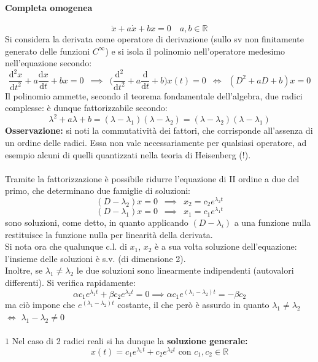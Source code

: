 \documentclass[10pt]{article}
\theoremstyle{plain}
\begin{document}
\paragraph*{Completa omogenea}
\[\ddot x + a \dot x + b x = 0 \quad a,b \in \mathbb{R}\]
Si considera la derivata come operatore di derivazione (sullo sv non finitamente generato delle funzioni $C^{\infty}$) e si isola il polinomio nell'operatore medesimo nell'equazione secondo:
\[\frac{\textrm{d}^2x}{\textrm{d}t^2} + a \frac{\textrm{d}x}{\textrm{d}t} + b x = 0 \enspace \implies \enspace \big(\frac{\textrm{d}^2}{\textrm{d}t^2} + a \frac{\textrm{d}}{\textrm{d}t} + b\big) x(t) = 0 \enspace \Leftrightarrow \enspace (D^2 + aD +b) x = 0\]
Il polinomio ammette, secondo il teorema fondamentale dell'algebra, due radici complesse: è dunque fattorizzabile secondo:
\[\lambda^2 + a\lambda + b = (\lambda - \lambda_1) (\lambda - \lambda_2) = (\lambda - \lambda_2) (\lambda - \lambda_1)\]
\textbf{Osservazione:} si noti la commutatività dei fattori, che corrisponde all'assenza di un ordine delle radici. Essa non vale necessariamente per qualsiasi operatore, ad esempio alcuni di quelli quantizzati nella teoria di Heisenberg (!).
\\~\\Tramite la fattorizzazione è possibile ridurre l'equazione di II ordine a due del primo, che determinano due famiglie di soluzioni:
\[(D - \lambda_2)x = 0 \enspace \implies \enspace x_2 = c_2 e^{\lambda_2 t}\]
\[(D - \lambda_1)x = 0 \enspace \implies \enspace x_1 = c_1 e^{\lambda_1 t}\]
sono soluzioni, come detto, in quanto applicando $(D - \lambda_i)$ a una funzione nulla restituisce la funzione nulla per linearità della derivata.
\\Si nota ora che qualunque c.l. di $x_1$, $x_2$ è a sua volta soluzione dell'equazione: l'insieme delle soluzioni è s.v. (di dimensione 2).
\\Inoltre, se $\lambda_1 \neq \lambda_2$ le due soluzioni sono linearmente indipendenti (autovalori differenti). Si verifica rapidamente:
\[\alpha c_1 e^{\lambda_1 t} + \beta c_2 e^{\lambda_2 t} = 0 \implies \alpha c_1 e^{(\lambda_1-\lambda_2) t} = - \beta c_2\]
ma ciò impone che $e^{(\lambda_1-\lambda_2) t}$ costante, il che però è assurdo in quanto $\lambda_1 \neq \lambda_2$ $\Leftrightarrow$ $\lambda_1 - \lambda_2 \neq 0$
\\~\\$\boxed{1}$ Nel caso di 2 radici reali si ha dunque la \textbf{soluzione generale:}
\[\boxed{x(t) = c_1 e^{\lambda_1 t} + c_2 e^{\lambda_2 t}} \textrm{ con } c_1, c_2 \in \mathbb{R}\]
\end{document}
